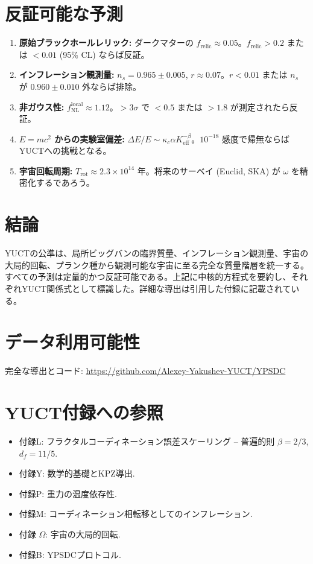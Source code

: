 \documentclass[12pt,a4paper]{article}
\begin{document}
	\section{反証可能な予測}
	
	\begin{enumerate}
		\item \textbf{原始ブラックホールレリック:} ダークマターの \(f_{\mathrm{relic}} \approx 0.05\)。\(f_{\mathrm{relic}}>0.2\) または \(<0.01\) (95\% CL) ならば反証。
		\item \textbf{インフレーション観測量:} \(n_s = 0.965\pm0.005\), \(r\approx 0.07\)。\(r<0.01\) または \(n_s\) が \(0.960\pm0.010\) 外ならば排除。
		\item \textbf{非ガウス性:} \(f_{\mathrm{NL}}^{\mathrm{local}} \approx 1.12\)。\(>3\sigma\) で \(<0.5\) または \(>1.8\) が測定されたら反証。
		\item \textbf{\(E=mc^2\) からの実験室偏差:} \(\Delta E/E \sim \kappa_c\alpha K_{\mathrm{eff}}^{-\beta}\)。\(10^{-18}\) 感度で帰無ならばYUCTへの挑戦となる。
		\item \textbf{宇宙回転周期:} \(T_{\mathrm{rot}} \approx 2.3\times10^{14}\) 年。将来のサーベイ (Euclid, SKA) が \(\omega\) を精密化するであろう。
	\end{enumerate}
	
	\section{結論}
	
	YUCTの公準は、局所ビッグバンの臨界質量、インフレーション観測量、宇宙の大局的回転、プランク種から観測可能な宇宙に至る完全な質量階層を統一する。すべての予測は定量的かつ反証可能である。上記に中核的方程式を要約し、それぞれYUCT関係式として標識した。詳細な導出は引用した付録に記載されている。
	
	\section*{データ利用可能性}
	
	完全な導出とコード: \url{https://github.com/Alexey-Yakushev-YUCT/YPSDC}
	
	\section*{YUCT付録への参照}
	\begin{itemize}
		\item 付録L: フラクタルコーディネーション誤差スケーリング – 普遍的則 \(\beta=2/3\), \(d_f=11/5\).
		\item 付録Y: 数学的基礎とKPZ導出.
		\item 付録P: 重力の温度依存性.
		\item 付録M: コーディネーション相転移としてのインフレーション.
		\item 付録 \(\Omega\): 宇宙の大局的回転.
		\item 付録B: YPSDCプロトコル.
	\end{itemize}
	
\end{document}
